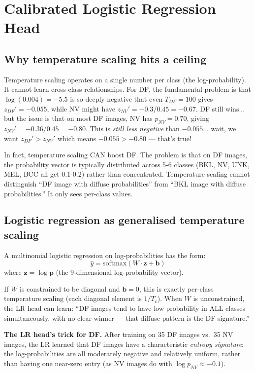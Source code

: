 \documentclass[12pt,a4paper]{article}
\begin{document}
\section{Calibrated Logistic Regression Head}

\subsection{Why temperature scaling hits a ceiling}

Temperature scaling operates on a single number per class (the log-probability). It cannot
learn cross-class relationships. For DF, the fundamental problem is that $\log(0.004) = -5.5$
is so deeply negative that even $T_{DF} = 100$ gives $z_{DF}' = -0.055$, while NV might have
$z_{NV}' = -0.3/0.45 = -0.67$. DF still wins... but the issue is that on most DF images, NV
has $p_{NV} = 0.70$, giving $z_{NV}' = -0.36/0.45 = -0.80$. This is \emph{still less negative}
than $-0.055$... wait, we want $z_{DF}' > z_{NV}'$ which means $-0.055 > -0.80$ --- that's true!

In fact, temperature scaling CAN boost DF. The problem is that on DF images, the probability
vector is typically distributed across 5-6 classes (BKL, NV, UNK, MEL, BCC all get 0.1-0.2)
rather than concentrated. Temperature scaling cannot distinguish ``DF image with diffuse
probabilities'' from ``BKL image with diffuse probabilities.'' It only sees per-class values.

\subsection{Logistic regression as generalised temperature scaling}

A multinomial logistic regression on log-probabilities has the form:
\[
\hat{y} = \mathrm{softmax}(W \cdot \mathbf{z} + \mathbf{b})
\]
where $\mathbf{z} = \log \mathbf{p}$ (the 9-dimensional log-probability vector).

If $W$ is constrained to be diagonal and $\mathbf{b} = 0$, this is exactly per-class temperature
scaling (each diagonal element is $1/T_c$). When $W$ is unconstrained, the LR head can learn:
``DF images tend to have low probability in ALL classes simultaneously, with no clear winner ---
that diffuse pattern is the DF signature.''

\begin{insight}
\textbf{The LR head's trick for DF.} After training on 35 DF images vs.\ 35 NV images, the
LR learned that DF images have a characteristic \emph{entropy signature}: the log-probabilities
are all moderately negative and relatively uniform, rather than having one near-zero entry
(as NV images do with $\log p_{NV} \approx -0.1$).
\end{insight}
\end{document}
